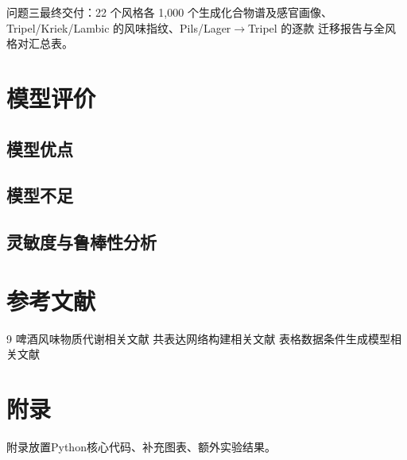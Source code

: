 \documentclass[12pt,a4paper]{article}
\begin{document}
问题三最终交付：22 个风格各 1{,}000 个生成化合物谱及感官画像、
Tripel\slash Kriek\slash Lambic 的风味指纹、Pils/Lager$\to$Tripel 的逐款
迁移报告与全风格对汇总表。
\section{模型评价}
\subsection{模型优点}
\subsection{模型不足}
\subsection{灵敏度与鲁棒性分析}

\section{参考文献}
\begin{thebibliography}{9}
 啤酒风味物质代谢相关文献
 共表达网络构建相关文献
 表格数据条件生成模型相关文献
\end{thebibliography}

\section{附录}
附录放置Python核心代码、补充图表、额外实验结果。
\end{document}
